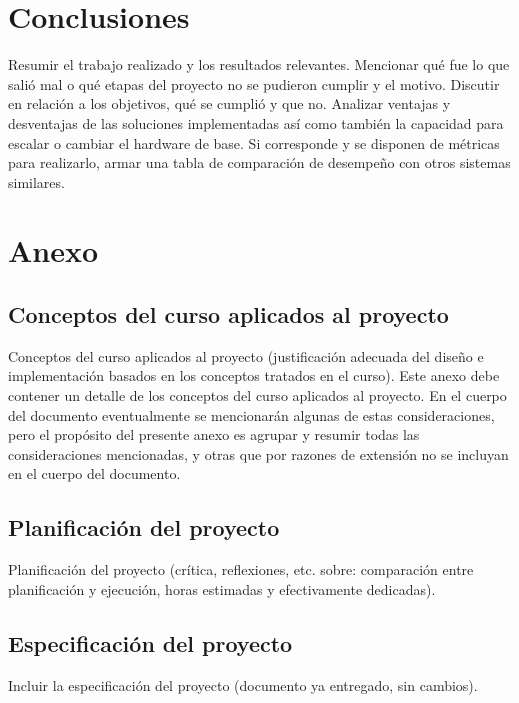\documentclass[a4paper,12pt]{article}
\begin{document}
\begin{linenumbers}
\begin{table}[ht]
\begin{tabular}{lccccccc}
 		 \hline 
 		\end{tabular}
 		\label{Tab:consumo}
\end{table}

\section{Conclusiones}
\label{sec:conclusiones}

Resumir el trabajo realizado y los resultados relevantes. Mencionar qué fue lo que sali\'o mal o qué etapas del proyecto no se pudieron 
cumplir y el motivo. Discutir en relaci\'on a los objetivos, qu\'e se cumpli\'o y que no.  Analizar ventajas y desventajas de las soluciones implementadas as\'i como tambi\'en la capacidad para escalar o cambiar el hardware de base. Si corresponde y se disponen de m\'etricas para realizarlo, armar una tabla de comparaci\'on de desempe\~no  con otros sistemas similares. 


\section{Anexo}
\label{sec:anexo}

\subsection{Conceptos del curso aplicados al proyecto}

Conceptos del curso aplicados al proyecto (justificaci\'on adecuada del dise\~no e implementaci\'on basados en los conceptos tratados en el curso). Este anexo debe contener un detalle de los conceptos del curso aplicados al proyecto. En el cuerpo del documento eventualmente se mencionar\'an algunas de estas consideraciones, pero el prop\'osito del presente anexo es agrupar y resumir todas las consideraciones mencionadas, y otras que por razones de extensi\'on no se incluyan en el cuerpo del documento.

\subsection{Planificaci\'on del proyecto}

Planificaci\'on del proyecto (cr\'itica, reflexiones, etc. sobre: comparaci\'on entre planificaci\'on y ejecuci\'on, horas estimadas y efectivamente dedicadas).

\subsection{Especificaci\'on del proyecto}

Incluir la especificaci\'on del proyecto (documento ya entregado, sin cambios). 

\renewcommand{\refname}{Bibliograf\'ia}





\end{linenumbers} %
\end{document}
